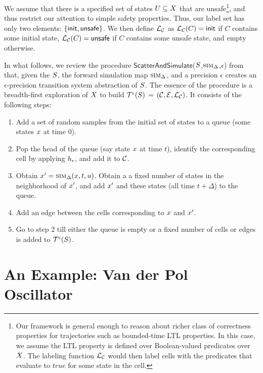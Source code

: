 We assume that there is a specified set of states $U
\subseteq X$ that are unsafe\footnote{Our framework is
general enough to reason about richer class of correctness properties
for trajectories such as bounded-time LTL properties. In this case, we
assume the LTL property is defined over Boolean-valued predicates over
$X$. The labeling function $\mathcal{L}_\mathcal{C}$ would
then label cells with the predicates that evaluate to $\mathit{true}$
for some state in the cell.}, and thus restrict our attention to
simple safety properties. Thus, our label set has only two elements:
$\{\mathsf{init},\mathsf{unsafe}\}$. We then define $\mathcal{L}_\mathcal{C}$ as
$\mathcal{L}_\mathcal{C}(C) = \mathsf{init}$ if $C$ contains some initial state,
$\mathcal{L}_\mathcal{C}(C) = \mathsf{unsafe}$ if $C$ contains some unsafe
state, and empty otherwise.

In what follows, we review the procedure
$\mathsf{ScatterAndSimulate}$($S$,$\mbox{\sc sim}_\Delta$,$\epsilon$)
from \cite{zutshi2014multiple} that, given the $S$, the forward
simulation map $\mbox{\sc sim}_\Delta$, and a precision $\epsilon$ creates an
$\epsilon$-precision transition system abstraction of $S$.  The
essence of the procedure is a breadth-first exploration of
$X$ to build $\mathcal{T}^{\epsilon}(S)$ =
$(\mathcal{C},\mathcal{E},\mathcal{L}_\mathcal{C})$. It consists of the
following steps:
\begin{enumerate}
\item
Add a set of random samples from the initial set of states to a queue
(\ie some states $x$ at time $0$).
\item
Pop the head of the queue (say state $x$ at time $t$), identify
the corresponding cell by applying $h_\epsilon$, and add it to
$\mathcal{C}$. 
\item
Obtain $x' = \mbox{\sc sim}_\Delta(x, t, u)$. Obtain a a
fixed number of states in the neighborhood of $x'$, and add
$x'$ and these states (all time $t+\Delta$) to the queue. 
\item
Add an edge between the cells corresponding to $x$ and 
$x'$.
\item
Go to step 2 till either the queue is empty or a fixed number of cells
or edges is added to $\mathcal{T}^{\epsilon}(S)$.
\end{enumerate}


\section{An Example: Van der Pol Oscillator}

